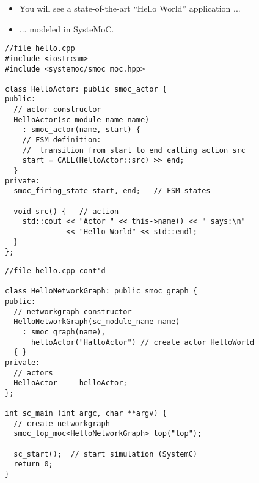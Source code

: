 \begin{frame}
\begin{itemize}
\item You will see a state-of-the-art ``Hello World'' application ...
\item ...  modeled in SysteMoC.
\end{itemize}
\end{frame}




\begin{frame}[fragile=singleslide]
\begin{lstlisting}
//file hello.cpp
#include <iostream>
#include <systemoc/smoc_moc.hpp>

class HelloActor: public smoc_actor {
public:
  // actor constructor
  HelloActor(sc_module_name name)
    : smoc_actor(name, start) {
    // FSM definition:
    //  transition from start to end calling action src
    start = CALL(HelloActor::src) >> end;
  }
private:
  smoc_firing_state start, end;   // FSM states

  void src() {   // action
    std::cout << "Actor " << this->name() << " says:\n"
              << "Hello World" << std::endl;
  }
};
\end{lstlisting}
\end{frame}

\begin{frame}[fragile=singleslide]
\begin{lstlisting}
//file hello.cpp cont'd

class HelloNetworkGraph: public smoc_graph {
public:
  // networkgraph constructor
  HelloNetworkGraph(sc_module_name name)
    : smoc_graph(name),
      helloActor("HalloActor") // create actor HelloWorld
  { }
private:
  // actors
  HelloActor     helloActor;
};

int sc_main (int argc, char **argv) {
  // create networkgraph
  smoc_top_moc<HelloNetworkGraph> top("top");

  sc_start();  // start simulation (SystemC)
  return 0;
}
\end{lstlisting}
\end{frame}

